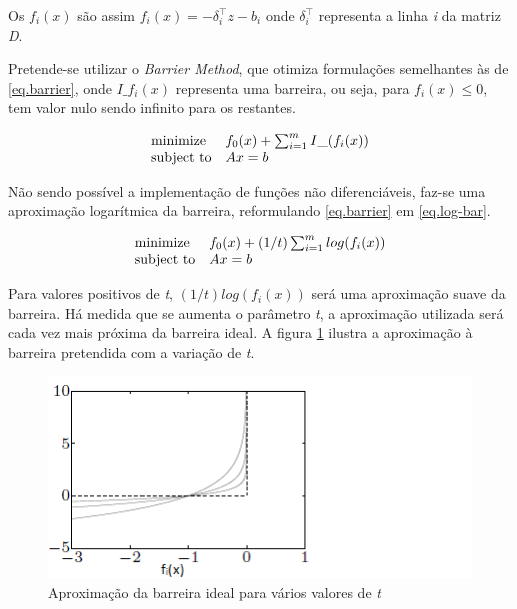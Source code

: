 \documentclass[a4paper]{IEEEtran}
\begin{document}
Os $f_i(x)$ são assim $f_i(x) = -\delta_i^\top z - b_i$ onde $\delta_i^\top$ representa a linha \textit{i} da matriz \textit{D}.

Pretende-se utilizar o \textit{Barrier Method}, que otimiza formulações semelhantes às de \ref{eq.barrier}, onde $I\_f_i(x)$ representa uma barreira, ou seja, para $f_i(x) \leq 0$, tem valor nulo sendo infinito para os restantes.

\begin{equation}
\label{eq.barrier}
\begin{array}[t]{ll} \text{minimize} & f_0(x) + \sum_{i=1}^{m} I\_(f_i(x)) \\
\text{subject to} &  Ax=b \end{array}
\end{equation}

Não sendo possível a implementação de funções não diferenciáveis, faz-se uma aproximação logarítmica da barreira, reformulando \ref{eq.barrier} em \ref{eq.log-bar}.

\begin{equation}
\label{eq.log-bar}
\begin{array}[t]{ll} \text{minimize} & f_0(x) + (1/t) \sum_{i=1}^{m} log(f_i(x)) \\
\text{subject to} &  Ax=b \end{array}
\end{equation}

Para valores positivos de \textit{t}, $(1/t) log(f_i(x))$ será uma aproximação suave da barreira. Há medida que se aumenta o parâmetro \textit{t}, a aproximação utilizada será cada vez mais próxima da barreira ideal. A figura \ref{fig:barrier} ilustra a aproximação à barreira pretendida com a variação de \textit{t}.

\begin{figure}[htp]
  \centering
  \includegraphics[width=0.9\columnwidth]{log-barrier.png}
  \caption{Aproximação da barreira ideal para vários valores de \textit{t}}
  \label{fig:barrier}
\end{figure}
\end{document}
